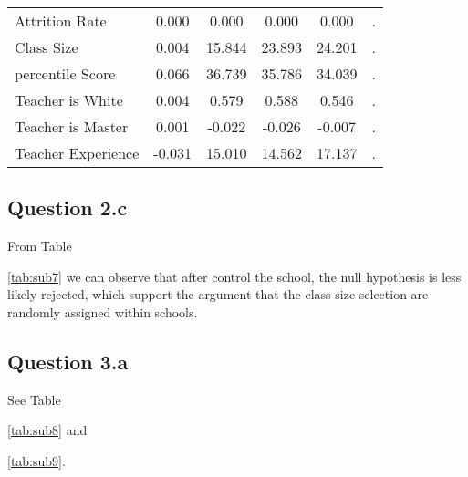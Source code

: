 \documentclass{article}
\begin{document}
{{{{{{{{\begin{table}[htbp]
\begin{tabular}{llccccc}
    \multicolumn{2}{l}{Attrition Rate} & 0.000  & 0.000  & 0.000  & 0.000  & . \\
    \multicolumn{2}{l}{Class Size} & 0.004  & 15.844  & 23.893  & 24.201  & . \\
    \multicolumn{2}{l}{percentile Score} & 0.066  & 36.739  & 35.786  & 34.039  & . \\
    \multicolumn{2}{l}{Teacher is White} & 0.004  & 0.579  & 0.588  & 0.546  & . \\
    \multicolumn{2}{l}{Teacher is Master} & 0.001  & -0.022  & -0.026  & -0.007  & . \\
    \multicolumn{2}{l}{Teacher Experience} & -0.031  & 15.010  & 14.562  & 17.137  & . \\
    \bottomrule
    \bottomrule
    \end{tabular}%
  \label{tab:addlabel}%
\end{table}%

\subsection*{Question 2.c}

From Table {\ref{tab:sub7} we can observe that after control the school, the null hypothesis is less likely rejected, which support the argument that the class size selection are randomly assigned within schools.


\subsection*{Question 3.a}


See Table {\ref{tab:sub8} and {\ref{tab:sub9}.

}}}}}}}}}}}
\end{document}
